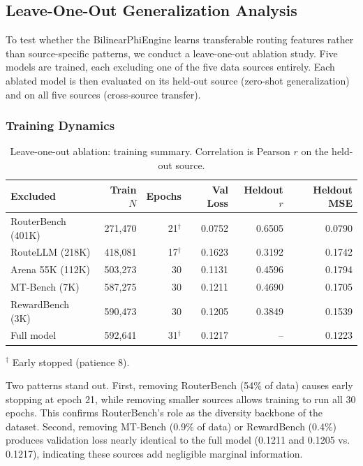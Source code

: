 \subsection{Leave-One-Out Generalization Analysis}

To test whether the BilinearPhiEngine learns transferable routing features rather than source-specific patterns, we conduct a leave-one-out ablation study. Five models are trained, each excluding one of the five data sources entirely. Each ablated model is then evaluated on its held-out source (zero-shot generalization) and on all five sources (cross-source transfer).

\subsubsection{Training Dynamics}

\begin{table}[h]
\centering
\caption{Leave-one-out ablation: training summary. Correlation is Pearson $r$ on the held-out source.}
\label{tab:loo_training}
\small
\begin{tabular}{lrrrrr}
\toprule
\textbf{Excluded} & \textbf{Train $N$} & \textbf{Epochs} & \textbf{Val Loss} & \textbf{Heldout $r$} & \textbf{Heldout MSE} \\
\midrule
RouterBench (401K) & 271,470 & 21$^\dagger$ & 0.0752 & 0.6505 & 0.0790 \\
RouteLLM (218K) & 418,081 & 17$^\dagger$ & 0.1623 & 0.3192 & 0.1742 \\
Arena 55K (112K) & 503,273 & 30 & 0.1131 & 0.4596 & 0.1794 \\
MT-Bench (7K) & 587,275 & 30 & 0.1211 & 0.4690 & 0.1705 \\
RewardBench (3K) & 590,473 & 30 & 0.1205 & 0.3849 & 0.1539 \\
\midrule
Full model & 592,641 & 31$^\dagger$ & 0.1217 & -- & 0.1223 \\
\bottomrule
\end{tabular}
\begin{flushleft}
\small $^\dagger$ Early stopped (patience 8).
\end{flushleft}
\end{table}

Two patterns stand out. First, removing RouterBench (54\% of data) causes early stopping at epoch 21, while removing smaller sources allows training to run all 30 epochs. This confirms RouterBench's role as the diversity backbone of the dataset. Second, removing MT-Bench (0.9\% of data) or RewardBench (0.4\%) produces validation loss nearly identical to the full model (0.1211 and 0.1205 vs. 0.1217), indicating these sources add negligible marginal information.


